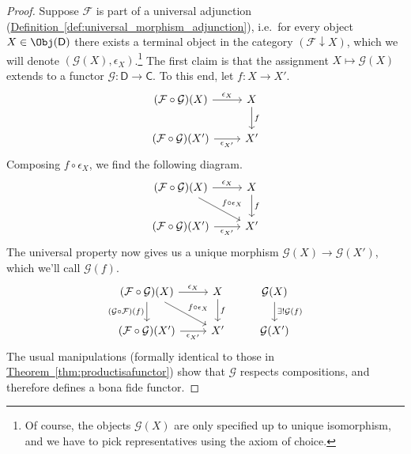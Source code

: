 \documentclass[main.tex]{subfiles}
\begin{document}
\begin{proof}
  Suppose $\mathcal{F}$ is part of a universal adjunction (\hyperref[def:universal_morphism_adjunction]{Definition~\ref*{def:universal_morphism_adjunction}}), i.e.\ for every object $X \in \Obj(\mathsf{D})$ there exists a terminal object in the category $(\mathcal{F} \downarrow X)$, which we will denote $(\mathcal{G}(X), \epsilon_{X})$.\footnote{Of course, the objects $\mathcal{G}(X)$ are only specified up to unique isomorphism, and we have to pick representatives using the axiom of choice.} The first claim is that the assignment $X \mapsto \mathcal{G}(X)$ extends to a functor $\mathcal{G}\colon \mathsf{D} \to \mathsf{C}$.  To this end, let $f\colon X \to X'$.
  \begin{equation*}
    \begin{tikzcd}
      (\mathcal{F} \circ \mathcal{G})(X)
      \arrow[r, "\epsilon_{X}"]
      & X
      \arrow[d, "f"]
      \\
      (\mathcal{F} \circ \mathcal{G})(X')
      \arrow[r, swap, "\epsilon_{X'}"]
      & X'
    \end{tikzcd}
  \end{equation*}
  Composing $f \circ \epsilon_{X}$, we find the following diagram.
  \begin{equation*}
    \begin{tikzcd}
      (\mathcal{F} \circ \mathcal{G})(X)
      \arrow[r, "\epsilon_{X}"]
      \arrow[rd, "f \circ \epsilon_{X}"]
      & X
      \arrow[d, "f"]
      \\
      (\mathcal{F} \circ \mathcal{G})(X')
      \arrow[r, swap, "\epsilon_{X'}"]
      & X'
    \end{tikzcd}
  \end{equation*}
  The universal property now gives us a unique morphism $\mathcal{G}(X) \to \mathcal{G}(X')$, which we'll call $\mathcal{G}(f)$.
  \begin{equation*}
    \begin{tikzcd}
      (\mathcal{F} \circ \mathcal{G})(X)
      \arrow[r, "\epsilon_{X}"]
      \arrow[rd, "f \circ \epsilon_{X}"]
      \arrow[d, swap, "(\mathcal{G} \circ \mathcal{F})(f)"]
      & X
      \arrow[d, "f"]
      & \mathcal{G}(X)
      \arrow[d, "\exists!\mathcal{G}(f)"]
      \\
      (\mathcal{F} \circ \mathcal{G})(X')
      \arrow[r, swap, "\epsilon_{X'}"]
      & X'
      & \mathcal{G}(X')
    \end{tikzcd}
  \end{equation*}
  The usual manipulations (formally identical to those in \hyperref[thm:productisafunctor]{Theorem~\ref*{thm:productisafunctor}}) show that $\mathcal{G}$ respects compositions, and therefore defines a bona fide functor.


\end{proof}
\end{document}

